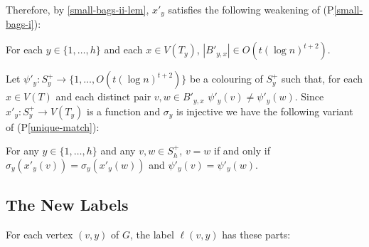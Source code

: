 \documentclass{patmorin}
\newcommand{\pref}[1]{(P\ref{#1})}
\newcommand{\psref}[1]{(P\ref{#1}$'$)}
\begin{document}
Therefore, by \cref{small-bags-ii-lem}, $x'_y$ satisfies the following weakening of \pref{small-bags-i}:

\begin{compactenum}[(P1$'$)]\setcounter{enumi}{2}
    \item For each $y\in\{1,\ldots,h\}$ and each $x\in V(T_y)$, $|B'_{y,x}|\in O(t(\log n)^{t+2})$. \label{small-bags-ii}
\end{compactenum}



Let $\psi'_y:S^+_y\to\{1,\ldots,O(t(\log n)^{t+2})\}$ be a colouring of $S^+_y$ such that, for each $x\in V(T)$ and each distinct pair $v,w\in B'_{y,x}$ $\psi'_y(v)\neq\psi'_y(w)$.  Since $x'_y:S^+_y\to V(T_y)$ is a function and $\sigma_y$ is injective we have the following variant of \pref{unique-match}:

\begin{compactenum}[(P1$'$)]\setcounter{enumi}{3}
    \item For any $y\in\{1,\ldots,h\}$ and any $v,w\in S^+_h$,  $v=w$ if and only if  $\sigma_y(x'_y(v))= \sigma_y(x'_y(w)) $ and $\psi'_y(v)=\psi'_y(w)$.\label{unique-match-ii}
\end{compactenum}

\subsection{The New Labels}


For each vertex $(v,y)$ of $G$, the label $\ell(v,y)$ has these parts:
\end{document}
